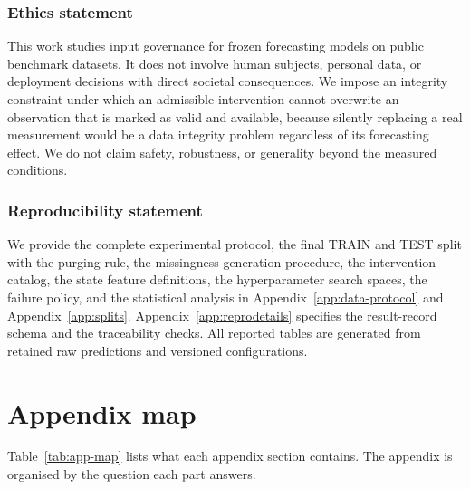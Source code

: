 \documentclass{article}
\begin{document}
\subsubsection*{Ethics statement}
This work studies input governance for frozen forecasting models on public benchmark datasets.
It does not involve human subjects, personal data, or deployment decisions with direct
societal consequences. We impose an integrity constraint under which an admissible
intervention cannot overwrite an observation that is marked as valid and available, because
silently replacing a real measurement would be a data integrity problem regardless of its
forecasting effect. We do not claim safety, robustness, or generality beyond the measured
conditions.

\subsubsection*{Reproducibility statement}
We provide the complete experimental protocol, the final TRAIN and TEST split with the
purging rule, the missingness generation procedure, the intervention catalog, the state
feature definitions, the hyperparameter search spaces, the failure policy, and the statistical
analysis in Appendix~\ref{app:data-protocol} and Appendix~\ref{app:splits}.
Appendix~\ref{app:reprodetails} specifies the result-record schema and the traceability checks.
All reported tables are generated from retained raw predictions and versioned configurations.




\appendix

\newpage

\section*{Appendix map}
\label{app:map}
Table~\ref{tab:app-map} lists what each appendix section contains. The appendix is organised
by the question each part answers.
\end{document}
